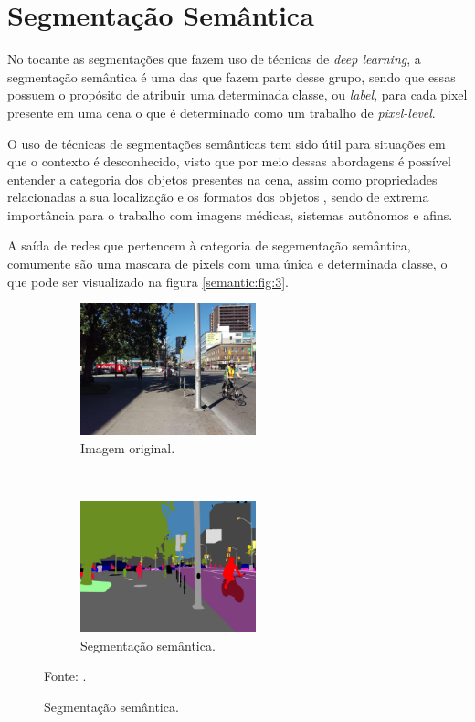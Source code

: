 \clearpage
\newpage
\section{Segmentação Semântica}
\label{semantic:semantic}

No tocante as segmentações que fazem uso de técnicas de \textit{deep learning}, a segmentação semântica é uma das que fazem parte desse grupo, sendo que essas possuem o propósito de atribuir uma determinada classe, ou \textit{label}, para cada pixel presente em uma cena \cite{Wang2017, Ghosh2019, Shelhamer2016, Arbelaez2012,Zhang2018} o que é determinado como um trabalho de \textit{pixel-level}.

O uso de técnicas de segmentações semânticas tem sido útil para situações em que o contexto é desconhecido, visto que por meio dessas abordagens é possível entender a categoria dos objetos presentes na cena, assim como propriedades relacionadas a sua localização e os formatos dos objetos \cite{Zhang2018}, sendo de extrema importância para o trabalho com imagens médicas, sistemas autônomos e afins.

A saída de redes que pertencem à categoria de segementação semântica, comumente são uma mascara de 
pixels com uma única e determinada classe, o que pode ser visualizado na figura \ref{semantic:fig:3}.

\begin{figure}[H]
   \caption{Segmentação semântica.}
   \centering
   \label{semantic:fig:3}
    \begin{subfigure}[t]{0.45\textwidth}
        \centering
        \includegraphics[height=1.5in]{recursos/imagens/semantic/t1.jpg}
        \caption{Imagem original.}
        \label{semantic:fig:3.1}
    \end{subfigure}%
    ~ 
    \begin{subfigure}[t]{0.45\textwidth}
        \centering
        \includegraphics[height=1.5in]{recursos/imagens/semantic/s1.png}
        \caption{Segmentação semântica.}
        \label{semantic:fig:3.2}
    \end{subfigure}%

    \vspace*{1 cm}
    Fonte: \cite{Neuhold2017_ICCV}.
\end{figure}

